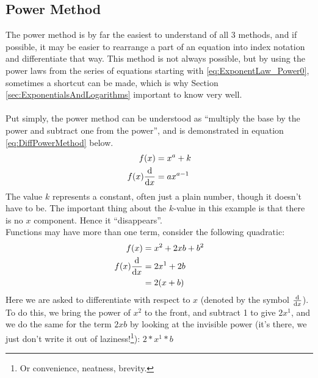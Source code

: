 \subsection{Power Method}
\label{sec:PowerMethod}
The power method is by far the easiest to understand of all 3 methods, and if
possible, it may be easier to rearrange a part of an equation into index
notation and differentiate that way. This method is not always possible,
but by using the power laws from the series of equations starting with
\ref{eq:ExponentLaw_Power0}, sometimes a shortcut can be made, which is why
Section \ref{sec:ExponentialsAndLogarithms} important to know very well.\\
\\
Put simply, the power method can be understood as ``multiply the base by the
power and subtract one from the power'', and is demonstrated in equation
\ref{eq:DiffPowerMethod} below.
\begin{align}
  f(x) & =   {x}^{a} + k \label{eq:DiffPowerMethodKValue} \\
  f(x)\frac{\mathrm{d}}{\mathrm{d}x} & =   a{x}^{a-1} \label{eq:DiffPowerMethod}
\end{align}
The value $k$ represents a constant, often just a plain number, though it
doesn't have to be. The important thing about the $k$-value in this example is
that there is no $x$ component. Hence it ``disappears''.\\
Functions may have more than one term, consider the following quadratic:
\begin{align}
  f(x)            & = {x}^{2} + 2xb + {b}^{2} \\
  f(x)\frac{\mathrm{d}}{\mathrm{d}x} & = 2{x}^{1} + 2b \\
                  & = 2(x+b) \label{eq:DiffPowerMethodRespectTo}
\end{align}
Here we are asked to differentiate with respect to $x$ (denoted by the symbol
$\frac{\mathrm{d}}{\mathrm{d}x}$). To do this, we bring the power of ${x}^{2}$ to the front, and
subtract 1 to give $2{x}^{1}$, and we do the same for the term ${2xb}$ by
looking at the invisible power (it's there, we just don't write it out of
laziness!\footnote{Or convenience, neatness, brevity.}): $2*{x}^{1}*b$
\newpage
